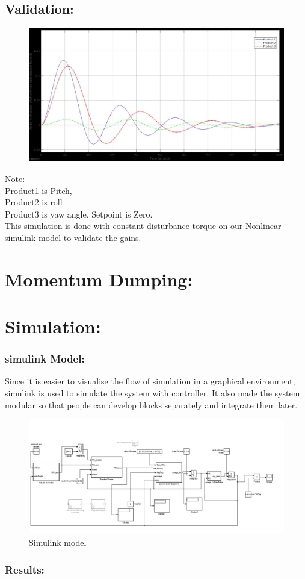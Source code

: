 \documentclass[10pt,a4paper]{report}
\begin{document}
\section{Validation:}
\begin{figure}[H]
	\centering
	\includegraphics[width=1.0\linewidth]{simulation_at_constantTOrq_pryangles}
	\caption{}
	\label{Constant disturbance torque. Pitch, Roll and yaw angles}
\end{figure}
	Note: \\Product1 is Pitch, \\Product2 is roll \\ Product3 is yaw angle.
	Setpoint is Zero. \\
This simulation is done with constant disturbance torque on our Nonlinear simulink model to validate the gains.
\chapter{Momentum Dumping:}
\chapter{Simulation:}
\subsection{simulink Model:}
Since it is easier to visualise the flow of simulation in a graphical environment, simulink is used to simulate the system with controller.
It also made the system modular so that people can develop blocks separately and integrate them later.
\begin{figure}[H]
\centering
\includegraphics[scale=0.3]{Untitled1.png}
\caption{Simulink model}
\end{figure}
\subsection{Results:}
\end{document}
